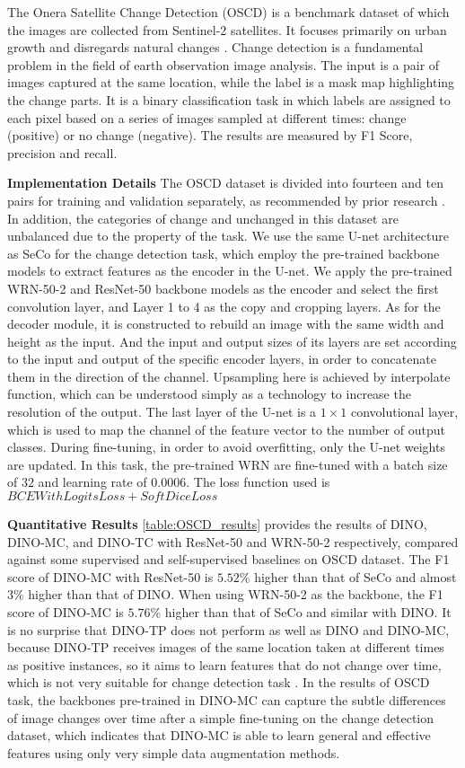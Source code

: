 \documentclass[10pt,twocolumn,letterpaper]{article}
\begin{document}
The Onera Satellite Change Detection (OSCD) is a benchmark dataset of which the images are collected from Sentinel-2 satellites. 
It focuses primarily on urban growth and disregards natural changes \cite{daudt2018urban}. 
Change detection is a fundamental problem in the field of earth observation image analysis.
The input is a pair of images captured at the same location, while the label is a mask map highlighting the change parts.
It is a binary classification task in which labels are assigned to each pixel based on a series of images sampled at different times: change (positive) or no change (negative).
The results are measured by F1 Score, precision and recall.

\textbf{Implementation Details }
The OSCD dataset is divided into fourteen and ten pairs for training and validation separately, as recommended by prior research \cite{daudt2018urban, manas2021seasonal}.
In addition, the categories of change and unchanged in this dataset are unbalanced due to the property of the task.
We use the same U-net architecture as SeCo for the change detection task, which employ the pre-trained backbone models to extract features as the encoder in the U-net.
We apply the pre-trained WRN-50-2 and ResNet-50 backbone models as the encoder and select the first convolution layer, and Layer 1 to 4 as the copy and cropping layers.
As for the decoder module, it is  constructed  to rebuild an image with the same width and height as the input.
And the input and output sizes of its layers are set according to the input and output of the specific encoder layers, in order to concatenate them in the direction of the channel.
Upsampling here is achieved by interpolate function, which can be understood simply as a technology to increase the resolution of the output.
The last layer of the U-net is a $1\times 1$ convolutional layer, which is used to map the channel of the feature vector to the number of output classes.
During fine-tuning, in order to avoid overfitting, only the U-net weights are updated.
In this task, the pre-trained WRN are fine-tuned with a batch size of $32$ and learning rate of $0.0006$.
The loss function used is $BCEWithLogitsLoss + SoftDiceLoss$

\textbf{Quantitative Results}
\cref{table:OSCD_results} provides the results of DINO, DINO-MC, and DINO-TC with ResNet-50 and WRN-50-2 respectively, compared against some supervised and self-supervised baselines on OSCD dataset.
The F1 score of DINO-MC with ResNet-50 is $5.52\%$ higher than that of SeCo and almost $3\%$ higher than that of DINO.
When using WRN-50-2 as the backbone, the F1 score of DINO-MC is $5.76\%$ higher than that of SeCo and similar with DINO.
It is no surprise that DINO-TP does not perform as well as DINO and DINO-MC, because DINO-TP receives images of the same location taken at different times as positive instances, so it aims to learn features that do not change over time, which is not very suitable for change detection task \cite{manas2021seasonal}.
In the results of OSCD task, the backbones pre-trained in DINO-MC can capture the subtle differences of image changes over time after a simple fine-tuning on the change detection dataset, which indicates that DINO-MC is able to learn general and effective features using only very simple data augmentation methods.
\end{document}
